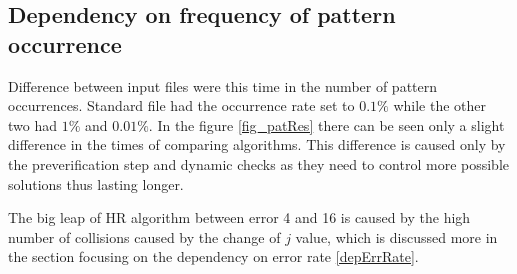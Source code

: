 \subsection{Dependency on frequency of pattern occurrence}
Difference between input files were this time in the number of pattern occurrences. Standard file had the occurrence rate set to $0.1 \%$ while the other two had $1 \%$ and $0.01 \%$. In the figure \ref{fig_patRes} there can be seen only a slight difference in the times of comparing algorithms. This difference is caused only by the preverification step and dynamic checks as they need to control more possible solutions thus lasting longer.

The big leap of HR algorithm between error 4 and 16 is caused by the high number of collisions caused by the change of $j$ value, which is discussed more in the section focusing on the dependency on error rate \ref{depErrRate}.

